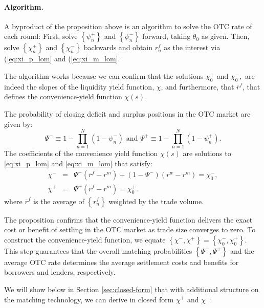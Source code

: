 \documentclass[12pt,american,english,notitlepage]{article}
\begin{document}
\paragraph{Algorithm.}

A byproduct of the proposition above is an algorithm to solve the
OTC rate of each round: First, solve $\left\{ \psi_{n}^{+}\right\} $
and $\left\{ \psi_{n}^{-}\right\} $ forward, taking $\theta_{0}$
as given. Then, solve $\left\{ \chi_{n}^{+}\right\} $ and $\left\{ \chi_{n}^{-}\right\} $
backwards and obtain $r_{n}^{f}$ as the interest via (\eqref{eq:xi_p_lom}
and (\eqref{eq:xi_m_lom}.

The algorithm works because we can confirm that the solutions $\chi_{0}^{+}$
and $\chi_{0}^{-},$ are indeed the slopes of the liquidity yield
function, $\chi$, and furthermore, that $\overline{r}^{f}$, that
defines the convenience-yield function $\chi\left(s\right)$.

\begin{proposition}
\label{P_Consistency} The probability of closing deficit and surplus
positions in the OTC market are given by:
\[
\Psi^{-}\equiv1-\prod_{n=1}^{N}\left(1-\psi_{n}^{-}\right)\text{ and }\Psi^{+}\equiv1-\prod_{n=1}^{N}\left(1-\psi_{n}^{+}\right).
\]
The coefficients of the convenience yield function $\chi(s)$ are
solutions to \eqref{eq:xi_p_lom} and \eqref{eq:xi_m_lom} that satisfy:
\begin{eqnarray*}
\chi^{-} & = & \Psi^{-}(\overline{r}^{f}-r^{m})+(1-\Psi^{-})(r^{w}-r^{m})=\chi_{0}^{-},\\
\chi^{+} & = & \Psi^{+}(\overline{r}^{f}-r^{m})=\chi_{0}^{+}.
\end{eqnarray*}
where $\overline{r}^{f}$ is the average of $\left\{ r_{n}^{f}\right\} $
weighted by the trade volume.

\end{proposition}

The proposition confirms that the convenience-yield function delivers
the exact cost or benefit of settling in the OTC market as trade size
converges to zero.  To construct the convenience-yield function, we
equate $\left\{ \chi^{-},\chi^{+}\right\} =\left\{ \chi_{0}^{-},\chi_{0}^{+}\right\} $.
This step guarantees that the overall matching probabilities $\left\{ \Psi^{-},\Psi^{+}\right\} $
and the average OTC rate determines the average
settlement costs and benefits for borrowers and lenders, respectively.

We will show below in Section \ref{sec:closed-form} that with additional structure on the matching technology, we can derive in closed form $\chi^+$ and $\chi^-$.
\end{document}
